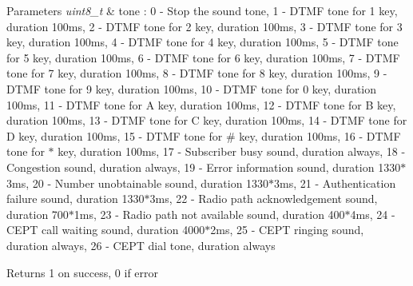 \begin{DoxyParams}{Parameters}
{\em uint8\+\_\+t} & tone \+: \textquotesingle{}0\textquotesingle{} -\/ Stop the sound tone, \textquotesingle{}1\textquotesingle{} -\/ D\+T\+MF tone for 1 key, duration 100ms, \textquotesingle{}2\textquotesingle{} -\/ D\+T\+MF tone for 2 key, duration 100ms, \textquotesingle{}3\textquotesingle{} -\/ D\+T\+MF tone for 3 key, duration 100ms, \textquotesingle{}4\textquotesingle{} -\/ D\+T\+MF tone for 4 key, duration 100ms, \textquotesingle{}5\textquotesingle{} -\/ D\+T\+MF tone for 5 key, duration 100ms, \textquotesingle{}6\textquotesingle{} -\/ D\+T\+MF tone for 6 key, duration 100ms, \textquotesingle{}7\textquotesingle{} -\/ D\+T\+MF tone for 7 key, duration 100ms, \textquotesingle{}8\textquotesingle{} -\/ D\+T\+MF tone for 8 key, duration 100ms, \textquotesingle{}9\textquotesingle{} -\/ D\+T\+MF tone for 9 key, duration 100ms, \textquotesingle{}10\textquotesingle{} -\/ D\+T\+MF tone for 0 key, duration 100ms, \textquotesingle{}11\textquotesingle{} -\/ D\+T\+MF tone for A key, duration 100ms, \textquotesingle{}12\textquotesingle{} -\/ D\+T\+MF tone for B key, duration 100ms, \textquotesingle{}13\textquotesingle{} -\/ D\+T\+MF tone for C key, duration 100ms, \textquotesingle{}14\textquotesingle{} -\/ D\+T\+MF tone for D key, duration 100ms, \textquotesingle{}15\textquotesingle{} -\/ D\+T\+MF tone for \# key, duration 100ms, \textquotesingle{}16\textquotesingle{} -\/ D\+T\+MF tone for $\ast$ key, duration 100ms, \textquotesingle{}17\textquotesingle{} -\/ Subscriber busy sound, duration always, \textquotesingle{}18\textquotesingle{} -\/ Congestion sound, duration always, \textquotesingle{}19\textquotesingle{} -\/ Error information sound, duration 1330$\ast$3ms, \textquotesingle{}20\textquotesingle{} -\/ Number unobtainable sound, duration 1330$\ast$3ms, \textquotesingle{}21\textquotesingle{} -\/ Authentication failure sound, duration 1330$\ast$3ms, \textquotesingle{}22\textquotesingle{} -\/ Radio path acknowledgement sound, duration 700$\ast$1ms, \textquotesingle{}23\textquotesingle{} -\/ Radio path not available sound, duration 400$\ast$4ms, \textquotesingle{}24\textquotesingle{} -\/ C\+E\+PT call waiting sound, duration 4000$\ast$2ms, \textquotesingle{}25\textquotesingle{} -\/ C\+E\+PT ringing sound, duration always, \textquotesingle{}26\textquotesingle{} -\/ C\+E\+PT dial tone, duration always \\
\hline
\end{DoxyParams}
\begin{DoxyReturn}{Returns}
\textquotesingle{}1\textquotesingle{} on success, \textquotesingle{}0\textquotesingle{} if error 
\end{DoxyReturn}
